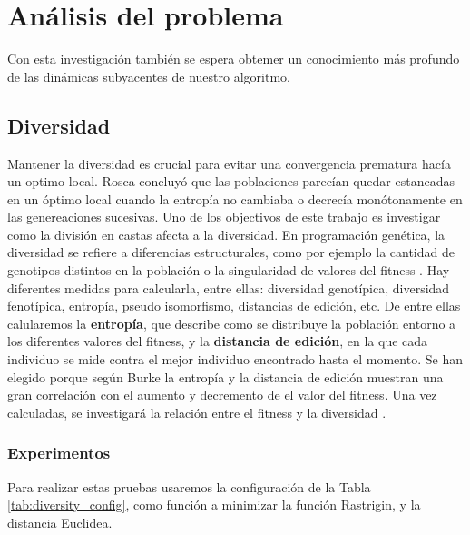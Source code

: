 \chapter{Análisis del problema}

Con esta investigación también se espera obtemer
un conocimiento más profundo de las dinámicas subyacentes de nuestro algoritmo. 

\section{Diversidad}

Mantener la diversidad es crucial para evitar una convergencia prematura hacía un optimo local. Rosca \cite{Rosca} concluyó que las poblaciones parecían quedar estancadas
en un óptimo local cuando la entropía no cambiaba o decrecía monótonamente en las genereaciones sucesivas. Uno de los objectivos de este trabajo es investigar como la 
división en castas afecta a la diversidad. En programación genética, la diversidad se refiere a diferencias estructurales, como por ejemplo la cantidad de genotipos 
distintos en la población o la singularidad de valores del fitness \cite{genetic}. Hay diferentes medidas para calcularla, entre ellas: diversidad genotípica, 
diversidad fenotípica, entropía, pseudo isomorfismo, distancias de edición, etc. De entre ellas calularemos la \textbf{entropía}, que describe como se distribuye la
población entorno a los diferentes valores del fitness, y la \textbf{distancia de edición}, en la que cada individuo se mide contra el mejor individuo encontrado hasta el 
momento. Se han elegido porque según Burke \cite{diversity} la entropía y la distancia de edición muestran una gran correlación con el aumento y decremento de el valor 
del fitness. Una vez calculadas, se investigará la relación entre el fitness y la  diversidad \cite{diversity}. 

\subsection{Experimentos}

Para realizar estas pruebas usaremos la configuración de la Tabla \ref{tab:diversity_config}, como función a minimizar la función Rastrigin\cite{BBOB}, y la distancia Euclidea.


